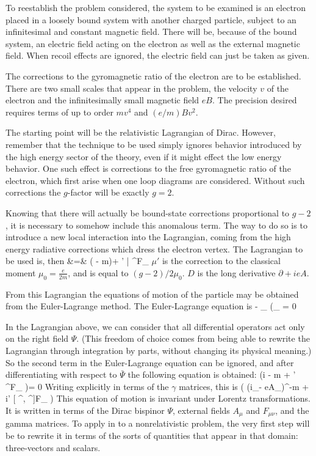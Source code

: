 To reestablish the problem considered, the system to be examined is an electron placed in a loosely bound system with another charged particle, subject to an infinitesimal and constant magnetic field.  There will be, because of the bound system, an electric field acting on the electron as well as the external magnetic field.  When recoil effects are ignored, the electric field can just be taken as given.

The corrections to the gyromagnetic ratio of the electron are to be established.  There are two small scales that appear in the problem, the velocity $v$ of the electron and the infinitesimally small magnetic field $eB$.  The precision desired requires terms of up to order $mv^4$ and $ (e/m)Bv^2$.

The starting point will be the relativistic Lagrangian of Dirac.  However, remember that the technique to be used simply ignores behavior introduced by the high energy sector of the theory, even if it might effect the low energy behavior.  One such effect is corrections to the free gyromagnetic ratio of the electron, which first arise when one loop diagrams are considered.  Without such corrections the $g$-factor will be exactly $g=2$.

Knowing that there will actually be bound-state corrections proportional to $g-2$, it is necessary to somehow include this anomalous term.  The way to do so is to introduce a new local interaction into the Lagrangian, coming from the high energy radiative corrections which dress the electron vertex.  The Lagrangian to be used is, then
\beqa
{} &=&	
	\Psigbar( - m)\Psi +  \mu' \bar{\Psi} \sigma^{\mu\nu}F_{\mu\nu} \Psig	
\eeqa
$\mu'$ is the correction to the classical moment $\mu_0 = \frac{e}{2m}$, and is equal to $(g-2)/2 \mu_0$.  $D$ is the long derivative $\partial + ieA$.


From this Lagrangian the equations of motion of the particle may be obtained from the Euler-Lagrange method.  The Euler-Lagrange equation is
\beq
{} - \partial_\mu {} {\partial (\partial_\mu { \Psigbar )} } 
	= 0	
\eeq

In the Lagrangian above, we can consider that all differential operators act only on the right field $\Psi$.  (This freedom of choice comes from being able to rewrite the Lagrangian through integration by parts, without changing its physical meaning.)  So the second term in the Euler-Lagrange equation can be ignored, and after differentiating with respect to $\bar{\Psi}$ the following equation is obtained:
\beq
	(i - m +  \mu'  \sigma^{\mu\nu}F_{\mu\nu} )\Psig = 0	
\eeq
Writing explicitly in terms of the $\gamma$ matrices, this is
\beq \label{eq:Sh:eom}
	\left( (i\partial_\mu- eA_\mu)\gamma^\mu -m + i\mu' [ \gamma^\mu, \gamma^\nu]F_{\mu\nu} \right) 
\eeq
This equation of motion is invariant under Lorentz transformations.  It is written in terms of the Dirac bispinor $\Psi$, external fields $A_\mu$ and $F_{\mu\nu}$, and the gamma matrices.  To apply in to a nonrelativistic problem, the very first step will be to rewrite it in terms of the sorts of quantities that appear in that domain: three-vectors and scalars.

